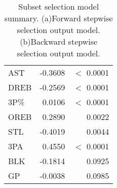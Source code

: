 \begin{table}[H]
\begin{subtable}[h]{0.4\textwidth}
\begin{tabular}{|| l | r | r ||}
			AST & -0.3608 & $<$ 0.0001 \\
			DREB & -0.2569 & $<$ 0.0001 \\
			3P\% & 0.0106 & $<$ 0.0001 \\
			OREB & 0.2890 & 0.0022 \\
			STL & -0.4019 & 0.0044 \\
			3PA & 0.4550 & $<$ 0.0001 \\
			BLK & -0.1814 & 0.0925 \\
			GP & -0.0038 & 0.0985 \\
			\hline
		\end{tabular}
		\caption{}
		\label{table:BackwardModelSummary}
	\end{subtable}
	\caption{Subset selection model summary. (a)Forward stepwise selection output model. (b)Backward stepwise selection output model.}
	\label{table:SubSelModSum}
\end{table}

